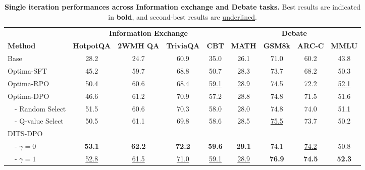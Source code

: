 \begin{table*}[t]
    \centering
    \caption{\textbf{Single iteration performances across Information exchange and Debate tasks.} Best results are indicated in \textbf{bold}, and second-best results are \underline{underlined}.}
    \vskip 0.1in
    \begin{tabular}{lcccccccc}
    \toprule
    & \multicolumn{4}{c}{\textbf{Information Exchange}} & \multicolumn{4}{c}{\textbf{Debate}} \\
    \cmidrule(lr){2-5} \cmidrule(lr){6-9}
     \textbf{Method} & \multicolumn{1}{c}{\textbf{HotpotQA}} & \multicolumn{1}{c}{\textbf{2WMH QA}}  &\multicolumn{1}{c}{\textbf{TriviaQA}} & \multicolumn{1}{c}{\textbf{CBT}}  & \multicolumn{1}{c}{\textbf{MATH}}  & \multicolumn{1}{c}{\textbf{GSM8k}} & \multicolumn{1}{c}{\textbf{ARC-C}}&\multicolumn{1}{c}{\textbf{MMLU}} \\
    
    \midrule
    Base & 28.2  & 24.7  & 60.9  & 35.0 &26.1 &71.0  & 60.2 & 43.8 \\
    Optima-SFT  & 45.2  & 59.7   & 68.8  & 50.7 & 28.3 &73.7  & 68.2 & 50.3 \\
    \midrule
    Optima-RPO & 50.4 & 60.6 &68.4 &\underline{59.1}  &\underline{28.9}  &74.5 & 72.2  & \underline{52.1} \\
     
    Optima-DPO   & 46.6 & 61.2 &70.9  & 57.2 &28.8 & 74.8 & 71.5 & 51.6 \\
    $\quad$- Random Select            &51.5 & 60.6 & 70.3  & 58.0  & 28.0 & 74.8 &74.0 &51.1\\
    
    $\quad$- Q-value Select          &50.5  & 61.1 &69.8  &58.6 & 28.5 &  \underline{75.5} &73.7 &50.2 \\
    \midrule
    DITS-DPO  && &&  && && \\
    $\quad$- $\gamma=0$ &\textbf{53.1}  & \textbf{62.2} &\textbf{72.2}  &\textbf{59.6}  & \textbf{29.1}  & 74.1  &\underline{74.2} &50.8 \\
    $\quad$- $\gamma=1$    &\underline{52.8}  & \underline{61.5}  & \underline{71.0} &\underline{59.1}  & \underline{28.9} &  \textbf{76.9} &\textbf{74.5}  &\textbf{52.3} \\
    \bottomrule
    \end{tabular}
    \label{tab:single-iteration}
\end{table*}